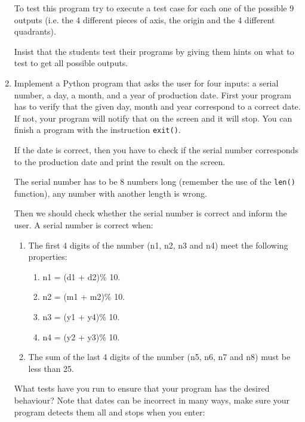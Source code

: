 \documentclass[
  fontsize=10pt,
  a4paper,
]{scrartcl}
\newenvironment{howTILEd}%
  {\begin{mdframed}[skipabove=10pt,skipbelow=10pt,backgroundcolor=pink!40]}%
  {\end{mdframed}}
\begin{document}
\begin{enumerate}
To test this program try to execute a test case for each one of the possible 9 outputs (i.e. the 4 different pieces of axis, the origin and the 4 different quadrants).

\begin{howTILEd}
Insist that the students test their programs by giving them hints on what to test to get all possible outputs.
\end{howTILEd}





\item Implement a Python program that asks the user for four inputs:
a serial number, a day, a month, and a year of production date.
First your program has to verify that the given day, month and year correspond to a correct date. If not, your program will notify that on the screen and it will stop. You can finish a program with the instruction \verb|exit()|.

If the date is correct, then you have to check if the serial number corresponds to the production date and print the result on the screen.

The serial number has to be 8 numbers long (remember the use of the \verb|len()| function), any number with another length is wrong.

Then we should check whether the serial number is correct and inform the user.
A serial number is correct when:

\begin{enumerate}
\item The first 4 digits of the number (n1, n2, n3 and n4) meet the following properties:

\begin{enumerate}
    \item n1 = (d1 + d2)\% 10.
    \item n2 = (m1 + m2)\% 10.
    \item n3 = (y1 + y4)\% 10.
    \item n4 = (y2 + y3)\% 10.
\end{enumerate}

\item The sum of the last 4 digits of the number (n5, n6, n7 and n8) must be less than 25.
\end{enumerate}

What tests have you run to ensure that your program has the desired behaviour? Note that dates can be incorrect in many ways, make sure your program detects them all and stops when you enter:


\end{enumerate}
\end{document}

